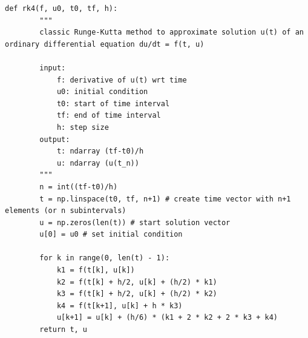\documentclass[11pt]{article}
\begin{document}
\begin{lstlisting}[style=python-custom, caption={Algoritmos para os métodos de Euler, Heun e RK4.}, label={lst:metodos_edo}]
    def rk4(f, u0, t0, tf, h):
        """
        classic Runge-Kutta method to approximate solution u(t) of an ordinary differential equation du/dt = f(t, u)

        input:
            f: derivative of u(t) wrt time
            u0: initial condition
            t0: start of time interval
            tf: end of time interval
            h: step size
        output:
            t: ndarray (tf-t0)/h
            u: ndarray (u(t_n))
        """
        n = int((tf-t0)/h)
        t = np.linspace(t0, tf, n+1) # create time vector with n+1 elements (or n subintervals)
        u = np.zeros(len(t)) # start solution vector
        u[0] = u0 # set initial condition

        for k in range(0, len(t) - 1):
            k1 = f(t[k], u[k])
            k2 = f(t[k] + h/2, u[k] + (h/2) * k1)
            k3 = f(t[k] + h/2, u[k] + (h/2) * k2)
            k4 = f(t[k+1], u[k] + h * k3)
            u[k+1] = u[k] + (h/6) * (k1 + 2 * k2 + 2 * k3 + k4)
        return t, u
\end{lstlisting}
\end{document}
